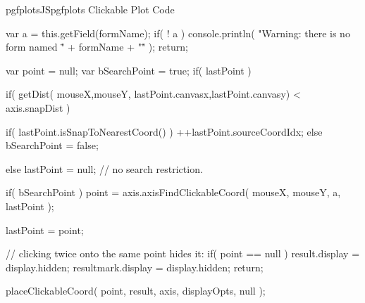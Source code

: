 {{\begin{insDLJS}[processAnnotatedPlot]{pgfplotsJS}{pgfplots Clickable Plot Code}
{	var a = this.getField(formName);
	if( ! a ) {
		console.println( "Warning: there is no form named \"" + formName + "\"" );
		return;
	}

	var point = null;
	var bSearchPoint = true;
	if( lastPoint ) {
		if( getDist( mouseX,mouseY,  lastPoint.canvasx,lastPoint.canvasy) < axis.snapDist ) {
			if( lastPoint.isSnapToNearestCoord() )
				++lastPoint.sourceCoordIdx;
			else
				bSearchPoint = false;

		} else
			lastPoint = null; // no search restriction.
	}
	if( bSearchPoint )
		point = axis.axisFindClickableCoord( mouseX, mouseY, a, lastPoint ); 

	lastPoint = point;

	// clicking twice onto the same point hides it:
	if( point == null ) {
		result.display = display.hidden;
		resultmark.display = display.hidden;
		return;
	}

	placeClickableCoord( 
		point,
		result, axis, displayOpts, null );
}

\end{insDLJS}

%
%
\def\pgfplots@clickable@xypat@error{\pgfplots@error{Sorry, \string\pgfplotsset{annot/xy pattern/.initial=...} can only be assigned *before* \string\usepgfplotslibrary{clickable}}}%
%
%
\def\pgfplots@clickable@nosuchcoord@error{\pgfplots@error{Sorry, \string\pgfplotsset{annot/no such coord/.initial=...} can only be assigned *before* \string\usepgfplotslibrary{clickable}}}%

\def\pgfplots@clickable@beginaxis{%
	\pgfplotsapplistXglobalnewempty\pgfplots@clickable@collectedplots
	\gdef\pgfplots@clickable@collectedplots@isempty{1}%
}%

}}
